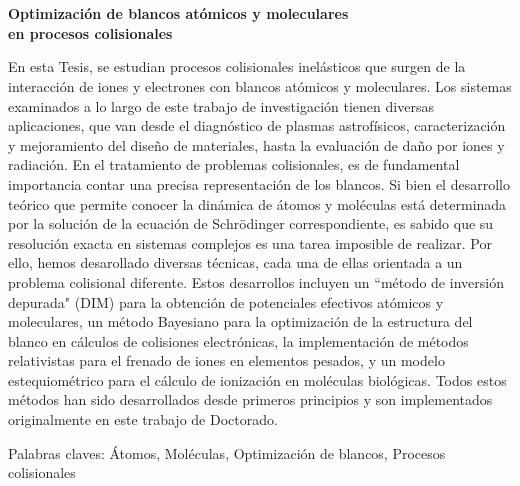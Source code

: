 \chapter*{}%
%

\begin{center}
\begin{large}
\textbf{Optimización de blancos atómicos y moleculares \\ en procesos colisionales}
\end{large}
\end{center}

\vspace{1cm}
En esta Tesis, se estudian procesos colisionales inelásticos que surgen 
de la interacción de iones y electrones con blancos atómicos y 
moleculares. Los sistemas examinados a lo largo de este trabajo de 
investigación tienen diversas aplicaciones, que van desde el diagnóstico 
de plasmas astrofísicos, caracterización y mejoramiento del diseño de 
materiales, hasta la evaluación de daño por iones y radiación. 
En el tratamiento de problemas colisionales, es de fundamental importancia 
contar una precisa representación de los blancos. Si bien el desarrollo 
teórico que permite conocer la dinámica de átomos y moléculas está 
determinada por la solución de la ecuación de Schr\"odinger 
correspondiente, es sabido que su resolución exacta en sistemas 
complejos es una tarea imposible de realizar. Por ello, hemos 
desarollado diversas técnicas, cada una de ellas orientada a un problema
colisional diferente. Estos desarrollos incluyen un ``método de inversión 
depurada" (DIM) para la obtención de potenciales efectivos atómicos y 
moleculares, un método Bayesiano para la optimización de la estructura 
del blanco en cálculos de colisiones electrónicas, la implementación 
de métodos relativistas para el frenado de iones en elementos pesados, 
y un modelo estequiométrico para el cálculo de ionización en moléculas 
biológicas.
Todos estos métodos han sido desarrollados desde primeros principios y
son implementados originalmente en este trabajo de Doctorado.


\vspace{1cm}
\noindent
Palabras claves:  
Átomos,
Moléculas,
Optimización de blancos,
Procesos colisionales
